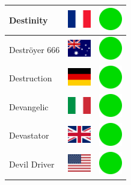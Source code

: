 \documentclass[12pt, a4paper, twoside]{report}
\begin{document}
\begin{center}
\begin{longtable}{|p{5cm}|p{2cm}|p{2cm}|}
 Destinity                                                  & \includegraphics[width=1cm]{../img/flags/fr} &   \includegraphics[width=1cm]{../likes/y} \\ \hline
 Deströyer 666                                              & \includegraphics[width=1cm]{../img/flags/au} &   \includegraphics[width=1cm]{../likes/y} \\ \hline
 Destruction                                                & \includegraphics[width=1cm]{../img/flags/de} &   \includegraphics[width=1cm]{../likes/y} \\ \hline
 Devangelic                                                 & \includegraphics[width=1cm]{../img/flags/it} &   \includegraphics[width=1cm]{../likes/y} \\ \hline
 Devastator                                                 & \includegraphics[width=1cm]{../img/flags/gb} &   \includegraphics[width=1cm]{../likes/y} \\ \hline
 Devil Driver                                               & \includegraphics[width=1cm]{../img/flags/us} &   \includegraphics[width=1cm]{../likes/y} \\ \hline

\end{longtable}
\end{center}
\end{document}
